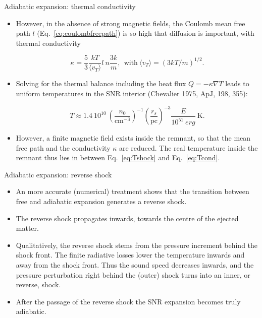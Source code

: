 \begin{frame}{Adiabatic expansion:
  thermal conductivity }

\begin{itemize}


\item However, in the absence of strong magnetic fields, the Coulomb
  mean free path $l$ (Eq.~\ref{eq:coulombfreepath}) is so high that
  diffusion is important, with thermal conductivity 

\begin{equation}
\kappa = \frac{5}{3} \frac{k T}{\langle v_{T} \rangle} l ~n
\frac{3k}{m}, ~~\text{with}~ \langle v_{T} \rangle = (3 k T /
m)^{1/2}. 
\end{equation}

\item Solving for the thermal balance including the heat flux $Q = -
  \kappa \nabla T$ leads to uniform temperatures in the SNR interior
  (Chevalier 1975, ApJ, 198, 355):

\begin{equation} T \approx
1.4~10^{10}~\left(\frac{n_0}{\mathrm{cm}^{-3}}\right)^{-1} \left(
\frac{r_s}{\mathrm{pc}} \right)^{-3} \frac{E}{10^{51}~erg} ~
\mathrm{K}. \label{eq:Tcond}
\end{equation}

\item However, a finite magnetic field exists inside the remnant, so
  that the mean free path and the conductivity $\kappa$ are reduced.
  The real temperature inside the remnant thus lies in between
  Eq.~\ref{eq:Tshock} and  Eq.~\ref{eq:Tcond}. 


\end{itemize}

\end{frame}




\begin{frame}{Adiabatic expansion: reverse shock }


\begin{itemize}

\item An more accurate (numerical) treatment shows that the transition
  between free and adiabatic expansion generates a reverse shock.

\item The reverse shock propagates inwards, towards the centre of the
  ejected matter.

\item Qualitatively, the reverse shock stems from the pressure
  increment behind the shock front. The finite radiative losses lower
  the temperature inwards and away from the shock front. Thus the
  sound speed decreases inwards, and the pressure perturbation right
  behind the (outer) shock turns into an inner, or reverse, shock.

\item After the passage of the reverse shock the SNR expansion becomes
  truly adiabatic.
\end{itemize}

\end{frame}





